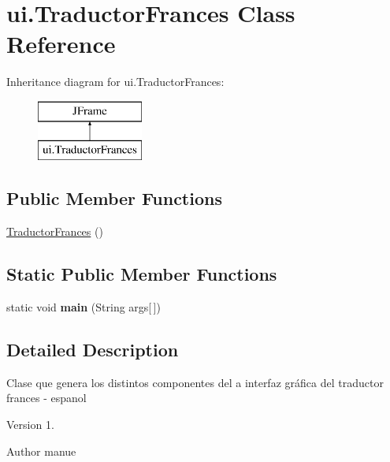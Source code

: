 \hypertarget{classui_1_1_traductor_frances}{}\section{ui.\+Traductor\+Frances Class Reference}
\label{classui_1_1_traductor_frances}
Inheritance diagram for ui.\+Traductor\+Frances\+:\begin{figure}[H]
\begin{center}
\leavevmode
\includegraphics[height=2.000000cm]{classui_1_1_traductor_frances}
\end{center}
\end{figure}
\subsection*{Public Member Functions}
\begin{DoxyCompactItemize}
\item 
\mbox{\hyperlink{classui_1_1_traductor_frances_a03d13843751898646109a36fd9bf3d14}{Traductor\+Frances}} ()
\end{DoxyCompactItemize}
\subsection*{Static Public Member Functions}
\begin{DoxyCompactItemize}
\item 
\mbox{\label{classui_1_1_traductor_frances_ab7a44f5a3a8c618c8d34e9b11c008d9d}} 
static void {\bfseries main} (String args\mbox{[}$\,$\mbox{]})
\end{DoxyCompactItemize}


\subsection{Detailed Description}
Clase que genera los distintos componentes del a interfaz gráfica del traductor frances -\/ espanol \begin{DoxyVersion}{Version}
1. 
\end{DoxyVersion}
\begin{DoxyAuthor}{Author}
manue 
\end{DoxyAuthor}


